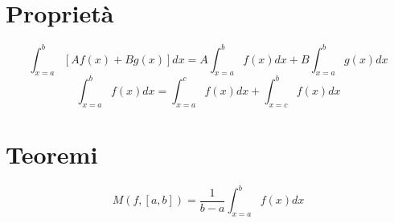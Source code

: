 \begin{definition}
\end{definition}

\section{Proprietà}
\begin{equation}\label{prop:integral:linearity:1}
    \int_{x=a}^{b} \left[ A f(x) + B g(x) \right] dx = A \int_{x=a}^{b} f(x) dx + B \int_{x=a}^{b} g(x) dx
\end{equation}
\begin{equation}\label{prop:integral:linearity:2}
    \int_{x=a}^{b} f(x) dx = \int_{x=a}^{c} f(x) dx + \int_{x=c}^{b} f(x) dx
\end{equation}

\section{Teoremi}
\begin{definition}[Media]
    \begin{equation}
        M(f, [a,b]) = \dfrac{1}{b-a} \int_{x=a}^{b} f(x) dx
    \end{equation}
\end{definition}

